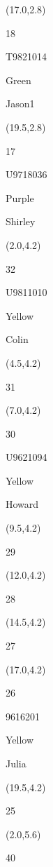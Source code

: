 \documentclass[a4paper]{article}
\newcommand{\myseat}[5]{%
\vspace{-0.1cm} \hspace{-0.5cm}
\parbox[t][2.2cm][t]{3.5cm}{%
\small #1 %
\begin{description}
\vspace{-0.1cm}
\item [ID:] #2
\vspace{-0.1cm}
\item [Team:] #3 \normalsize
\vspace{-0.1cm}
\item \normalsize #4 #5
\vspace{-0.1cm}
\end{description}
}
}
\begin{document}
\begin{CJK}{UTF8}{cyberbit}
\begin{textblock}{2.5}(17.0,2.8)
\myseat{18}{T9821014}{Green}{Jason1}{}
\end{textblock}

\begin{textblock}{2.5}(19.5,2.8)
\myseat{17}{U9718036}{Purple}{Shirley}{}
\end{textblock}


\begin{textblock}{2.5}(2.0,4.2)
\myseat{32}{U9811010}{Yellow}{Colin}{}
\end{textblock}

\begin{textblock}{2.5}(4.5,4.2)
\textblockcolor{}
\myseat{31}{}{}{}{}
\end{textblock}

\begin{textblock}{2.5}(7.0,4.2)
\myseat{30}{U9621094}{Yellow}{Howard}{}
\end{textblock}

\begin{textblock}{2.5}(9.5,4.2)
\textblockcolor{}
\myseat{29}{}{}{}{}
\end{textblock}

\begin{textblock}{2.5}(12.0,4.2)
\textblockcolor{}
\myseat{28}{}{}{}{}
\end{textblock}

\begin{textblock}{2.5}(14.5,4.2)
\textblockcolor{}
\myseat{27}{}{}{}{}
\end{textblock}

\begin{textblock}{2.5}(17.0,4.2)
\myseat{26}{9616201}{Yellow}{Julia}{}
\end{textblock}

\begin{textblock}{2.5}(19.5,4.2)
\textblockcolor{}
\myseat{25}{}{}{}{}
\end{textblock}


\begin{textblock}{2.5}(2.0,5.6)
\textblockcolor{}
\myseat{40}{}{}{}{}
\end{textblock}


\end{CJK}
\end{document}
